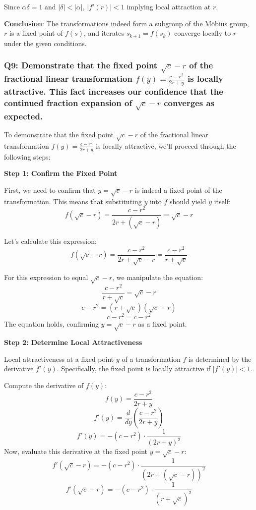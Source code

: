 \documentclass[8pt]{article}
\begin{document}
Since \( \alpha \delta = 1 \) and \( |\delta| < |\alpha| \), \( |f'(r)| < 1 \) implying local attraction at \( r \).

\textbf{Conclusion}: The transformations indeed form a subgroup of the Möbius group, \( r \) is a fixed point of \( f(s) \), and iterates \( s_{k+1} = f(s_k) \) converge locally to \( r \) under the given conditions.

\subsubsection*{Q9: Demonstrate that the fixed point \( \sqrt{c} - r \) of the fractional linear transformation \( f(y) = \frac{c - r^2}{2r + y} \) is locally attractive. This fact increases our confidence that the continued fraction expansion of \( \sqrt{c} - r \) converges as expected.}

To demonstrate that the fixed point \(\sqrt{c} - r\) of the fractional linear transformation \(f(y) = \frac{c - r^2}{2r + y}\) is locally attractive, we'll proceed through the following steps:

\textbf{Step 1: Confirm the Fixed Point}

First, we need to confirm that \(y = \sqrt{c} - r\) is indeed a fixed point of the transformation. This means that substituting \(y\) into \(f\) should yield \(y\) itself:
\[ f(\sqrt{c} - r) = \frac{c - r^2}{2r + (\sqrt{c} - r)} = \sqrt{c} - r \]

Let's calculate this expression:
\[ f(\sqrt{c} - r) = \frac{c - r^2}{2r + \sqrt{c} - r} = \frac{c - r^2}{r + \sqrt{c}} \]

For this expression to equal \(\sqrt{c} - r\), we manipulate the equation:
\[ \frac{c - r^2}{r + \sqrt{c}} = \sqrt{c} - r \]
\[ c - r^2 = (r + \sqrt{c})(\sqrt{c} - r) \]
\[ c - r^2 = c - r^2 \]
The equation holds, confirming \(y = \sqrt{c} - r\) as a fixed point.

\textbf{Step 2: Determine Local Attractiveness}

Local attractiveness at a fixed point \(y\) of a transformation \(f\) is determined by the derivative \(f'(y)\). Specifically, the fixed point is locally attractive if \(|f'(y)| < 1\).

Compute the derivative of \(f(y)\):
\[ f(y) = \frac{c - r^2}{2r + y} \]
\[ f'(y) = \frac{d}{dy}\left(\frac{c - r^2}{2r + y}\right) \]
\[ f'(y) = -(c - r^2) \cdot \frac{1}{(2r + y)^2} \]
Now, evaluate this derivative at the fixed point \(y = \sqrt{c} - r\):
\[ f'(\sqrt{c} - r) = -(c - r^2) \cdot \frac{1}{(2r + (\sqrt{c} - r))^2} \]
\[ f'(\sqrt{c} - r) = -(c - r^2) \cdot \frac{1}{(r + \sqrt{c})^2} \]
\end{document}
